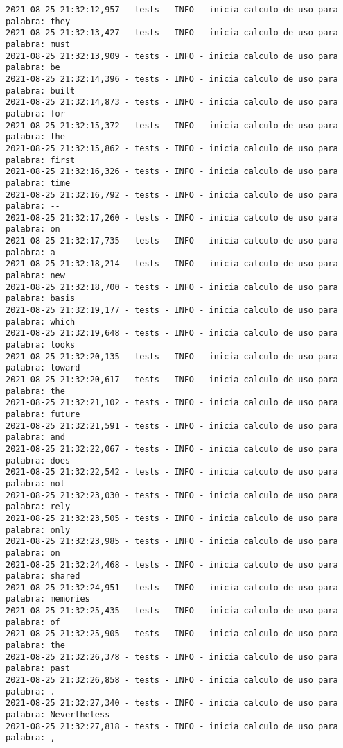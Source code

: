\documentclass[11pt]{article}
\begin{document}
\begin{verbatim}
2021-08-25 21:32:12,957 - tests - INFO - inicia calculo de uso para palabra: they
2021-08-25 21:32:13,427 - tests - INFO - inicia calculo de uso para palabra: must
2021-08-25 21:32:13,909 - tests - INFO - inicia calculo de uso para palabra: be
2021-08-25 21:32:14,396 - tests - INFO - inicia calculo de uso para palabra: built
2021-08-25 21:32:14,873 - tests - INFO - inicia calculo de uso para palabra: for
2021-08-25 21:32:15,372 - tests - INFO - inicia calculo de uso para palabra: the
2021-08-25 21:32:15,862 - tests - INFO - inicia calculo de uso para palabra: first
2021-08-25 21:32:16,326 - tests - INFO - inicia calculo de uso para palabra: time
2021-08-25 21:32:16,792 - tests - INFO - inicia calculo de uso para palabra: --
2021-08-25 21:32:17,260 - tests - INFO - inicia calculo de uso para palabra: on
2021-08-25 21:32:17,735 - tests - INFO - inicia calculo de uso para palabra: a
2021-08-25 21:32:18,214 - tests - INFO - inicia calculo de uso para palabra: new
2021-08-25 21:32:18,700 - tests - INFO - inicia calculo de uso para palabra: basis
2021-08-25 21:32:19,177 - tests - INFO - inicia calculo de uso para palabra: which
2021-08-25 21:32:19,648 - tests - INFO - inicia calculo de uso para palabra: looks
2021-08-25 21:32:20,135 - tests - INFO - inicia calculo de uso para palabra: toward
2021-08-25 21:32:20,617 - tests - INFO - inicia calculo de uso para palabra: the
2021-08-25 21:32:21,102 - tests - INFO - inicia calculo de uso para palabra: future
2021-08-25 21:32:21,591 - tests - INFO - inicia calculo de uso para palabra: and
2021-08-25 21:32:22,067 - tests - INFO - inicia calculo de uso para palabra: does
2021-08-25 21:32:22,542 - tests - INFO - inicia calculo de uso para palabra: not
2021-08-25 21:32:23,030 - tests - INFO - inicia calculo de uso para palabra: rely
2021-08-25 21:32:23,505 - tests - INFO - inicia calculo de uso para palabra: only
2021-08-25 21:32:23,985 - tests - INFO - inicia calculo de uso para palabra: on
2021-08-25 21:32:24,468 - tests - INFO - inicia calculo de uso para palabra: shared
2021-08-25 21:32:24,951 - tests - INFO - inicia calculo de uso para palabra: memories
2021-08-25 21:32:25,435 - tests - INFO - inicia calculo de uso para palabra: of
2021-08-25 21:32:25,905 - tests - INFO - inicia calculo de uso para palabra: the
2021-08-25 21:32:26,378 - tests - INFO - inicia calculo de uso para palabra: past
2021-08-25 21:32:26,858 - tests - INFO - inicia calculo de uso para palabra: .
2021-08-25 21:32:27,340 - tests - INFO - inicia calculo de uso para palabra: Nevertheless
2021-08-25 21:32:27,818 - tests - INFO - inicia calculo de uso para palabra: ,

\end{verbatim}
\end{document}
